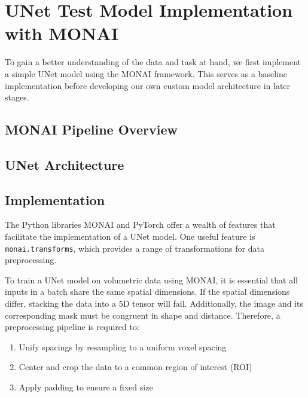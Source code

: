\chapter{UNet Test Model Implementation with MONAI}
\label{ch:unet_model}
To gain a better understanding of the data and task at hand, we first implement a simple UNet model using the MONAI framework. This serves as a baseline implementation before developing our own custom model architecture in later stages.

\section{MONAI Pipeline Overview}
\label{sec:monai_pipeline}


\section{UNet Architecture}
\label{sec:unet_architecture}


\section{Implementation}
\label{sec:implementation}

The Python libraries MONAI and PyTorch offer a wealth of features that facilitate the implementation of a UNet model. One useful feature is \texttt{monai.transforms}, which provides a range of transformations for data preprocessing.

To train a UNet model on volumetric data using MONAI, it is essential that all inputs in a batch share the same spatial dimensions. If the spatial dimensions differ, stacking the data into a 5D tensor will fail. Additionally, the image and its corresponding mask must be congruent in shape and distance. Therefore, a preprocessing pipeline is required to:

\begin{enumerate}
    \item Unify spacings by resampling to a uniform voxel spacing
    \item Center and crop the data to a common region of interest (ROI)
    \item Apply padding to ensure a fixed size
\end{enumerate}

